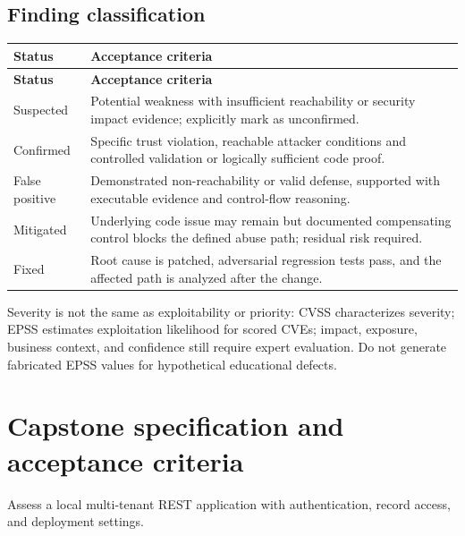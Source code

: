 \documentclass[10pt,letterpaper]{article}
\begin{document}
\subsection{Finding classification}
\begingroup\footnotesize\setlength\tabcolsep{3pt}
\begin{longtable}{>{\raggedright\arraybackslash}p{}>{\raggedright\arraybackslash}p{}}\toprule
\textbf{Status} & \textbf{Acceptance criteria}\\\midrule\endfirsthead
\toprule \textbf{Status} & \textbf{Acceptance criteria}\\\midrule\endhead
Suspected & Potential weakness with insufficient reachability or security impact evidence; explicitly mark as unconfirmed.\\\midrule
Confirmed & Specific trust violation, reachable attacker conditions and controlled validation or logically sufficient code proof.\\\midrule
False positive & Demonstrated non-reachability or valid defense, supported with executable evidence and control-flow reasoning.\\\midrule
Mitigated & Underlying code issue may remain but documented compensating control blocks the defined abuse path; residual risk required.\\\midrule
Fixed & Root cause is patched, adversarial regression tests pass, and the affected path is analyzed after the change.\\\midrule
\bottomrule\end{longtable}\endgroup
Severity is not the same as exploitability or priority: CVSS characterizes severity; EPSS estimates exploitation likelihood for scored CVEs; impact, exposure, business context, and confidence still require expert evaluation. Do not generate fabricated EPSS values for hypothetical educational defects.

\section{Capstone specification and acceptance criteria}
Assess a local multi-tenant REST application with authentication, record access, and deployment settings.
\end{document}
